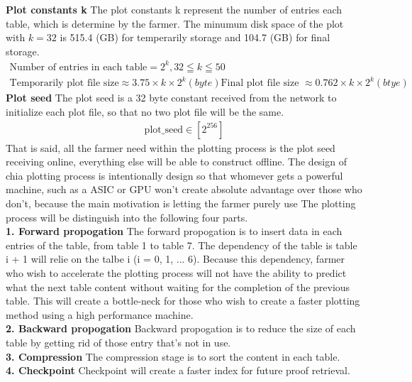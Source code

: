 \documentclass[sigconf, nonacm, natbib=false]{acmart}
\begin{document}
{\bf Plot constants k} The plot constants k represent the number of entries each table, which is determine by the farmer. The minumum disk space of the plot with $k = 32$ is 515.4 (GB) for temperarily storage and 104.7 (GB) for final storage. 
\begin{align*}
  \text{Number of entries in each table} = 2^{k}, 32 \leqq k \leqq 50 \\
  \text{Temporarily plot file size} \approx 3.75 \times k \times 2^{k} (byte)
  \text{Final plot file size } \approx 0.762 \times k \times 2^{k} (btye)
\end{align*}
{\bf Plot seed} The plot seed is a 32 byte constant received from the network to initialize each plot file, so that no two plot file will be the same. 
\begin{align*}
  \text{plot\_seed} \in [2^{256}]
\end{align*}
That is said, all the farmer need within the plotting process is the plot seed receiving online, everything else will be able to construct offline. The design of chia plotting process is intentionally design so that whomever gets a powerful machine, such as a ASIC or GPU won't create absolute advantage over those who don't, because the main motivation is letting the farmer purely use  The plotting process will be distinguish into the following four parts. \\
{\bf 1. Forward propogation}
The forward propogation is to insert data in each entries of the table, from table 1 to table 7. The dependency of the table is table i + 1 will relie on the talbe i (i = 0, 1, ... 6). Because this dependency, farmer who wish to accelerate the plotting process will not have the ability to predict what the next table content without waiting for the completion of the previous table. This will create a bottle-neck for those who wish to create a faster plotting method using a high performance machine. \\
{\bf 2. Backward propogation}
Backward propogation is to reduce the size of each table by getting rid of those entry that's not in use.\\
{\bf 3. Compression}
The compression stage is to sort the content in each table. \\
{\bf 4. Checkpoint}
Checkpoint will create a faster index for future proof retrieval. \\

\end{document}
